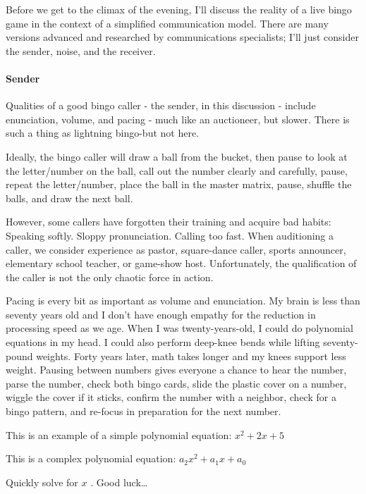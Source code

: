 \documentclass[
  letterpaper,
  DIV=11,
  numbers=noendperiod]{scrartcl}
\let\oldparagraph\paragraph
\renewcommand{\paragraph}[1]{\oldparagraph{#1}\mbox{}}
\begin{document}
Before we get to the climax of the evening, I'll discuss the reality of
a live bingo game in the context of a simplified communication model.
There are many versions advanced and researched by communications
specialists; I'll just consider the sender, noise, and the receiver.

\hypertarget{sender}{%
\paragraph{Sender}\label{sender}}

Qualities of a good bingo caller - the sender, in this discussion -
include enunciation, volume, and pacing - much like an auctioneer, but
slower. There is such a thing as lightning bingo-but not here.

Ideally, the bingo caller will draw a ball from the bucket, then pause
to look at the letter/number on the ball, call out the number clearly
and carefully, pause, repeat the letter/number, place the ball in the
master matrix, pause, shuffle the balls, and draw the next ball.

However, some callers have forgotten their training and acquire bad
habits: Speaking softly. Sloppy pronunciation. Calling too fast. When
auditioning a caller, we consider experience as pastor, square-dance
caller, sports announcer, elementary school teacher, or game-show host.
Unfortunately, the qualification of the caller is not the only chaotic
force in action.

Pacing is every bit as important as volume and enunciation. My brain is
less than seventy years old and I don't have enough empathy for the
reduction in processing speed as we age. When I was twenty-years-old, I
could do polynomial equations in my head. I could also perform deep-knee
bends while lifting seventy-pound weights. Forty years later, math takes
longer and my knees support less weight. Pausing between numbers gives
everyone a chance to hear the number, parse the number, check both bingo
cards, slide the plastic cover on a number, wiggle the cover if it
sticks, confirm the number with a neighbor, check for a bingo pattern,
and re-focus in preparation for the next number.

\begin{tcolorbox}[enhanced jigsaw, bottomrule=.15mm, title={Polynomial Equations}, colbacktitle=quarto-callout-note-color!10!white, left=2mm, leftrule=.75mm, coltitle=black, arc=.35mm, breakable, rightrule=.15mm, opacityback=0, bottomtitle=1mm, colframe=quarto-callout-note-color-frame, toprule=.15mm, toptitle=1mm, titlerule=0mm, opacitybacktitle=0.6, colback=white]
This is an example of a simple polynomial equation: \(x^2 + 2x +5\)

This is a complex polynomial equation: \(a_2x^2 + a_1x + a_0\)

Quickly solve for \(x\) . Good luck\ldots{}
\end{tcolorbox}
\end{document}
